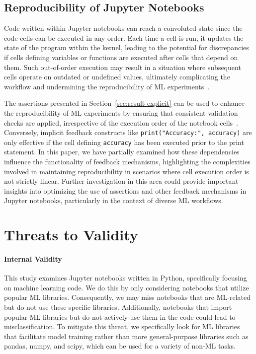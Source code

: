 \documentclass[journal]{IEEEtran}       %
\begin{document}
\subsection{Reproducibility of Jupyter Notebooks}

Code written within Jupyter notebooks can reach a convoluted state
since the code cells can be executed in any order. Each time a cell
is run, it updates the state of the program within the kernel,
leading to the potential for discrepancies if cells defining
variables or functions are executed after cells that depend on them.
Such out-of-order execution may result in a situation where
subsequent cells operate on outdated or undefined values, ultimately
complicating the workflow and undermining the reproducibility of ML
experiments~\cite{pimentel2019large-scale,wang2020assessing}.

The assertions presented in Section~\ref{sec:result-explicit} can be
used to enhance the reproducibility of ML experiments by ensuring
that consistent validation checks are applied, irrespective of the
execution order of the notebook cells~\cite{wang2020assessing}.
Conversely, implicit feedback constructs like
\lstinline{print("Accuracy:", accuracy)} are only effective if the
cell defining \lstinline{accuracy} has been executed prior to the
print statement. In this paper, we have partially examined how these
dependencies influence the functionality of feedback mechanisms,
highlighting the complexities involved in maintaining reproducibility
in scenarios where cell execution order is not strictly linear.
Further investigation in this area could provide important insights
into optimizing the use of assertions and other feedback mechanisms
in Jupyter notebooks, particularly in the context of diverse ML workflows.

\section{Threats to Validity}\label{sec:threats}

\paragraph{\textbf{Internal Validity}} This study examines Jupyter
notebooks written in Python, specifically focusing on machine
learning code. We do this by only considering notebooks that utilize
popular ML libraries. Consequently, we may miss notebooks that are
ML-related but do not use these specific libraries. Additionally,
notebooks that import popular ML libraries but do not actively use
them in the code could lead to misclassification. To mitigate this
threat, we specifically look for ML libraries that facilitate model
training rather than more general-purpose libraries such as pandas,
numpy, and scipy, which can be used for a variety of non-ML tasks.
\end{document}
